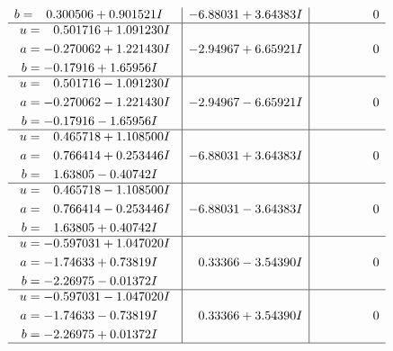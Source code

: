 \documentclass[1p]{elsarticle_modified}
\theoremstyle{definition}
\begin{document}
$$\begin{array}{c|c|c}
\begin{aligned}
b &= \phantom{-}0.300506 + 0.901521 I\end{aligned}
 & -6.88031 + 3.64383 I & \phantom{-0.000000 } 0 \\ \hline\begin{aligned}
u &= \phantom{-}0.501716 + 1.091230 I \\
a &= -0.270062 + 1.221430 I \\
b &= -0.17916 + 1.65956 I\end{aligned}
 & -2.94967 + 6.65921 I & \phantom{-0.000000 } 0 \\ \hline\begin{aligned}
u &= \phantom{-}0.501716 - 1.091230 I \\
a &= -0.270062 - 1.221430 I \\
b &= -0.17916 - 1.65956 I\end{aligned}
 & -2.94967 - 6.65921 I & \phantom{-0.000000 } 0 \\ \hline\begin{aligned}
u &= \phantom{-}0.465718 + 1.108500 I \\
a &= \phantom{-}0.766414 + 0.253446 I \\
b &= \phantom{-}1.63805 - 0.40742 I\end{aligned}
 & -6.88031 + 3.64383 I & \phantom{-0.000000 } 0 \\ \hline\begin{aligned}
u &= \phantom{-}0.465718 - 1.108500 I \\
a &= \phantom{-}0.766414 - 0.253446 I \\
b &= \phantom{-}1.63805 + 0.40742 I\end{aligned}
 & -6.88031 - 3.64383 I & \phantom{-0.000000 } 0 \\ \hline\begin{aligned}
u &= -0.597031 + 1.047020 I \\
a &= -1.74633 + 0.73819 I \\
b &= -2.26975 - 0.01372 I\end{aligned}
 & \phantom{-}0.33366 - 3.54390 I & \phantom{-0.000000 } 0 \\ \hline\begin{aligned}
u &= -0.597031 - 1.047020 I \\
a &= -1.74633 - 0.73819 I \\
b &= -2.26975 + 0.01372 I\end{aligned}
 & \phantom{-}0.33366 + 3.54390 I & \phantom{-0.000000 } 0\\
 \hline 
 \end{array}$$\newpage$$\begin{array}{c|c|c}  

\end{array}$$
\end{document}
